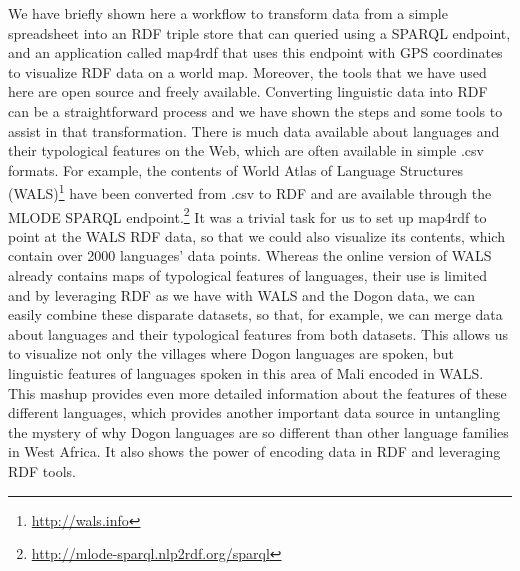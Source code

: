 
We have briefly shown here a workflow to transform data from a simple spreadsheet into an RDF triple store that can queried using a SPARQL endpoint, and an application called map4rdf that uses this endpoint with GPS coordinates to visualize RDF data on a world map. Moreover, the tools that we have used here are open source and freely available. Converting linguistic data into RDF can be a straightforward process and we have shown the steps and some tools to assist in that transformation. There is much data available about languages and their typological features on the Web, which are often available in simple .csv formats. For example, the contents of World Atlas of Language Structures (WALS)\footnote{\url{http://wals.info}} \cite{Haspelmath_etal2008} have been converted from .csv to RDF and are available through the MLODE SPARQL endpoint.\footnote{\url{http://mlode-sparql.nlp2rdf.org/sparql}} It was a trivial task for us to set up map4rdf to point at the WALS RDF data, so that we could also visualize its contents, which contain over 2000 languages' data points. Whereas the online version of WALS already contains maps of typological features of languages, their use is limited and by leveraging RDF as we have with WALS and the Dogon data, we can easily combine these disparate datasets, so that, for example, we can merge data about languages and their typological features from both datasets. This allows us to visualize not only the villages where Dogon languages are spoken, but linguistic features of languages spoken in this area of Mali encoded in WALS. This mashup provides even more detailed information about the features of these different languages, which provides another important data source in untangling the mystery of why Dogon languages are so different than other language families in West Africa. It also shows the power of encoding data in RDF and leveraging RDF tools.
